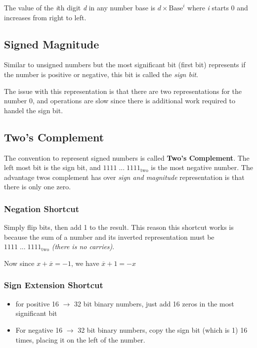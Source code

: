 \documentclass[12pt]{article}
\begin{document}
The value of the \emph{i}th digit \emph{d} in any number base is $d \times \text{Base}^i$ where \emph{i} starts 0 and increases from right to left.

\subsection*{Signed Magnitude}
Similar to unsigned numbers but the most significant bit (first bit) represents if the number is positive or negative, this bit is called the \emph{sign bit}.

The issue with this representation is that there are two representations for the number 0, and operations are slow since there is additional work required to handel the sign bit.
\subsection*{Two's Complement}
The convention to represent signed numbers is called \textbf{Two's Complement}. The left most bit is the sign bit, and $1111 \; ... \; 1111_{\text{two}}$ is the most negative number. The advantage twos complement has over \emph{sign and magnitude} representation is that there is only one zero.

\subsubsection*{Negation Shortcut}
Simply flip bits, then add 1 to the result.
This reason this shortcut works is because the sum of a number and its inverted representation must be $1111 \; ... \; 1111_{\text{two}}$ \emph{(there is no carries)}.

Now since $x + \overline{x} = -1 $, we have $\overline{x} + 1 = -x$

\subsubsection*{Sign Extension Shortcut}
\begin{itemize}
    \item for positive 16 $\rightarrow$ 32 bit binary numbers, just add 16 zeros in the most significant bit
    \item For negative 16 $\rightarrow$ 32 bit binary numbers, copy the sign bit (which is 1) 16 times, placing it on the left of the number.
\end{itemize}
\end{document}
